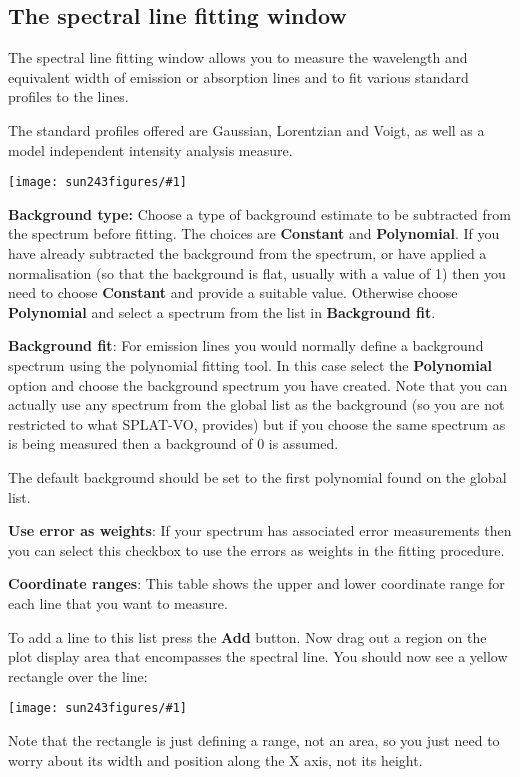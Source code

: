 \documentclass[twoside,11pt]{article}
\newcommand{\htmladdimg}[1]{}
\newcommand{\latexhtml}[2]{#1}
\renewcommand{\_}{\texttt{\symbol{95}}}
\newcommand{\SPLAT}{\textsf{SPLAT-VO}}
\newcommand{\mainfigure}[1]
{\begin{center}
 \latexhtml{\texttt{[image: sun243\_figures/\#1]}}{\htmladdimg{#1.gif}}
 \end{center}
}
\newcommand{\labelitem}[1]{\textbf{#1}}
\begin{document}
\newpage
\subsection{The spectral line fitting window}

The spectral line fitting window allows you to measure the wavelength
and equivalent width of emission or absorption lines and to fit
various standard profiles to the lines.

The standard profiles offered are Gaussian, Lorentzian and Voigt, as
well as a model independent intensity analysis measure.

\mainfigure{linefitwindow}

\labelitem{Background type:} Choose a type of background estimate to
be subtracted from the spectrum before fitting. The choices are
\labelitem{Constant} and \labelitem{Polynomial}. If you have already
subtracted the background from the spectrum, or have applied a
normalisation (so that the background is flat, usually with a value of
1) then you need to choose \labelitem{Constant} and provide a suitable
value. Otherwise choose \labelitem{Polynomial} and select a spectrum
from the list in \labelitem{Background fit}.

\labelitem{Background fit}: For emission lines you would normally
define a background spectrum using the polynomial fitting tool. In
this case select the \labelitem{Polynomial} option and choose the
background spectrum you have created. Note that you can actually use
any spectrum from the global list as the background (so you are not
restricted to what \SPLAT, provides) but if you choose the same
spectrum as is being measured then a background of $0$ is assumed.

The default background should be set to the first polynomial found on
the global list.

\labelitem{Use error as weights}: If your spectrum has associated
error measurements then you can select this checkbox to use the errors
as weights in the fitting procedure.

\labelitem{Coordinate ranges}: This table shows the upper and lower
coordinate range for each line that you want to measure.

To add a line to this list press the \labelitem{Add} button. Now drag
out a region on the plot display area that encompasses the spectral
line. You should now see a yellow rectangle over the line:

\mainfigure{linefitplotwindow}

Note that the rectangle is just defining a range, not an area, so you
just need to worry about its width and position along the X axis, not
its height.
\end{document}
